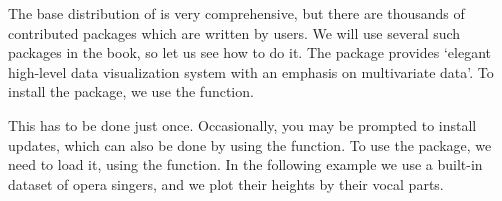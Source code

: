 The base distribution of \R is very comprehensive, but there are thousands of contributed packages which are written by \R users. We will use several such packages in the book, so let us see how to do it.
The package  provides `elegant high-level data visualization system with an emphasis on multivariate data'. To install the package, we use the  function.
\begin{knitrout}
\color{fgcolor}\begin{kframe}
\begin{alltt}
\hlstd{(}\hlstd{)}
\end{alltt}
\end{kframe}
\end{knitrout}
This has to be done just once. Occasionally, you may be prompted to install updates, which can also be done by using the  function.
To use the package, we need to load it, using the  function. In the following example we use a built-in dataset of opera singers, and we plot their heights by their vocal parts.
